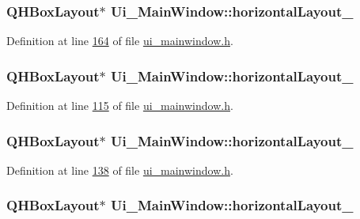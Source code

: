\hypertarget{a00080_a9403b9a7c13814220caeb1748ef9e672}{
\subsubsection[{horizontal\+Layout\+\_\+24}]{\setlength{\rightskip}{0pt plus 5cm}Q\+H\+Box\+Layout$\ast$ Ui\+\_\+\+Main\+Window\+::horizontal\+Layout\+\_}}\label{a00080_a9403b9a7c13814220caeb1748ef9e672}


Definition at line \hyperlink{a00139_source_l00164}{164} of file \hyperlink{a00139_source}{ui\+\_\+mainwindow.\+h}.

\hypertarget{a00080_a488ae2286c0922552e7a39a756e337d3}{
\subsubsection[{horizontal\+Layout\+\_\+25}]{\setlength{\rightskip}{0pt plus 5cm}Q\+H\+Box\+Layout$\ast$ Ui\+\_\+\+Main\+Window\+::horizontal\+Layout\+\_}}\label{a00080_a488ae2286c0922552e7a39a756e337d3}


Definition at line \hyperlink{a00139_source_l00115}{115} of file \hyperlink{a00139_source}{ui\+\_\+mainwindow.\+h}.

\hypertarget{a00080_afb4ab27a4cd626c64c34ab3651fa8413}{
\subsubsection[{horizontal\+Layout\+\_\+26}]{\setlength{\rightskip}{0pt plus 5cm}Q\+H\+Box\+Layout$\ast$ Ui\+\_\+\+Main\+Window\+::horizontal\+Layout\+\_}}\label{a00080_afb4ab27a4cd626c64c34ab3651fa8413}


Definition at line \hyperlink{a00139_source_l00138}{138} of file \hyperlink{a00139_source}{ui\+\_\+mainwindow.\+h}.

\hypertarget{a00080_acbfe65f9d2895246b00c82c815b5369e}{
\subsubsection[{horizontal\+Layout\+\_\+27}]{\setlength{\rightskip}{0pt plus 5cm}Q\+H\+Box\+Layout$\ast$ Ui\+\_\+\+Main\+Window\+::horizontal\+Layout\+\_}}\label{a00080_acbfe65f9d2895246b00c82c815b5369e}


